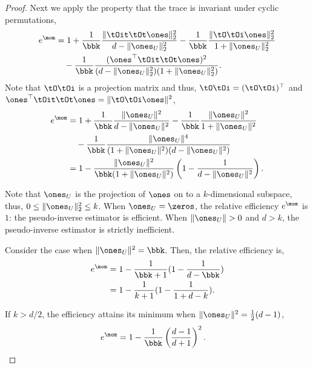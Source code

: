 \begin{proof}
Next we apply the property that the trace is invariant under cyclic
permutations,
\begin{align*}
  e^\mom
    &= 1 + \frac{1}{\bbk}
          \frac{
              \|\tOit \tOt \ones\|_2^2
          }{
            d - \|\ones_U\|_2^2 
          } 
        - \frac{1}{\bbk}
        \frac{\|\tO \tOi \ones\|_2^2}{1+ \|\ones_U\|_2^2} \\
    &\quad
    - \frac{1}{\bbk}
    \frac{(\ones^\top \tOit \tOt \ones)^2}
        {(d - \|\ones_U\|_2^2 ) (1+ \|\ones_U\|_2^2)}.
      \end{align*}
Note that $\tO\tOi$ is a projection matrix and thus, $\tO\tOi
      = (\tO\tOi)^\top$ and $\ones^\top \tOit\tOt \ones = \|\tO\tOi
      \ones\|^2$,
      \begin{align*}
        e^\mom
&= 1
+ \frac{1}{\bbk} \frac{\|\ones_U\|^2}{d - \|\ones_U\|^2}
    -  \frac{1}{\bbk}\frac{\|\ones_U\|^2}{1 + \|\ones_U\|^2}\\
&\quad
    -  \frac{1}{\bbk}\frac{\|\ones_U\|^4}{(1 + \|\ones_U\|^2)(d - \|\ones_U\|^2)} \\
    &= 1 - \frac{\|\ones_U\|^2}{\bbk (1 + \|\ones_U\|^2)} \left( 1 - \frac{1}{d - \|\ones_U\|^2} \right).
\end{align*}

Note that $\ones_U$ is the projection of $\ones$ on to a $k$-dimensional
subspace, thus, $0 \le \|\ones_U\|^2_2 \le k$.
When $\ones_U = \zeros$, the relative efficiency $e^\mom$ is $1$: the pseudo-inverse estimator is efficient. When $\|\ones_U\| > 0$ and $d > k$, the pseudo-inverse estimator is strictly inefficient.

Consider the case when $\|\ones_U\|^2 = \bbk$. Then, the relative efficiency
is,
\begin{align*}
  e^\mom 
    &= 1 - \frac{1}{\bbk +1} (1 - \frac{1}{d - \bbk}) \\
    &= 1 - \frac{1}{k +1} (1 - \frac{1}{1 + d - k}).
\end{align*}

If $k > d/2$, the efficiency attains its minimum when $\|\ones_U\|^2
= \frac{1}{2} (d-1)$, 
\begin{align*}
  e^\mom 
  &= 1 - \frac{1}{\bbk}\left(\frac{d-1}{d+1}\right)^2.
\end{align*}
\end{proof}



